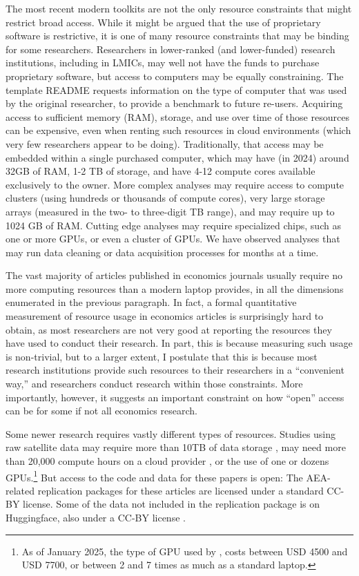 \documentclass{article}
\begin{document}
The most recent modern toolkits are not the only resource constraints that might restrict broad access. While it might be argued that the use of proprietary software is restrictive, it is one of many resource constraints that may be binding for some researchers. Researchers in lower-ranked (and lower-funded) research institutions, including in \acp{LMIC}, may well not have the funds to purchase proprietary software, but access to computers may be equally constraining. The template README requests information on the type of computer that was used by the original researcher, to provide a benchmark to future re-users. Acquiring access to sufficient memory (\ac{RAM}), storage, and use over time of those resources can be expensive, even when renting such resources in cloud environments (which very few researchers appear to be doing). Traditionally, that access may be embedded within a single purchased computer, which may have (in 2024) around 32GB of RAM, 1-2 TB of storage, and have 4-12 compute cores available exclusively to the owner. More complex analyses may require access to compute clusters (using hundreds or thousands of compute cores), very large storage arrays (measured in the two- to three-digit TB range), and may require up to 1024 GB of RAM. Cutting edge analyses may require specialized chips, such as one or more \acp{GPU}, or even a cluster of \acp{GPU}. We have observed analyses that may run data cleaning or data acquisition processes for months at a time. 

The vast majority of articles published in economics journals usually require no more computing resources than a modern laptop provides, in all the dimensions enumerated in the previous paragraph. In fact, a formal quantitative measurement of resource usage in economics articles is surprisingly hard to obtain, as most researchers are not very good at reporting the resources they have used to conduct their research. In part, this is because measuring such usage is non-trivial, but to a larger extent, I postulate that this is because most research institutions provide such resources to their researchers in a ``convenient way,'' and researchers conduct research within those constraints. More importantly, however, it suggests an important constraint on how ``open'' access can be for some if not all economics research.

Some newer research requires vastly different types of resources. Studies using raw satellite data may require more than 10TB of data storage \citep{khachiyan_using_2022,khachiyan_data_2022}, may need more than 20,000 compute hours on a cloud provider \citep{rudik_optimal_2020,rudik_data_2020}, or the use of one \citep{dell_deep_2024,dell_data_2025} or dozens \citep{khachiyan_data_2022} \acp{GPU}.\footnote{As of January 2025, the type of \ac{GPU} used by \citet{dell_data_2025}, costs between USD 4500 and USD 7700, or between 2 and 7 times as much as a standard laptop.} But  access to the code and data for these papers is open: The AEA-related replication packages for these articles are licensed under a standard \ac{CC-BY} license. Some of the data not included in the \citet{dell_data_2025} replication package is on Huggingface, also under a \ac{CC-BY} license \citep{dell_research_harvard_newswire_nodate}.
\end{document}
